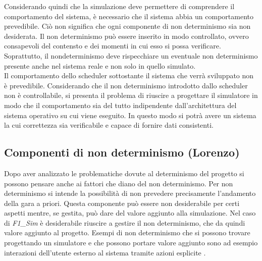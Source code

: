 Considerando quindi che la simulazione deve permettere di comprendere il comportamento del sistema, è necessario che il sistema abbia 
un comportamento prevedibile. Ciò non significa che ogni componente di non determinismo sia non desiderata. Il non determinismo
può essere inserito in modo controllato, ovvero consapevoli del contensto e dei momenti in cui esso si possa verificare. Soprattutto,
il nondeterminismo deve rispecchiare un eventuale non determinismo presente anche nel sistema reale e non solo in quello simulato.\\
Il comportamento dello scheduler sottostante il sistema che verrà sviluppato non è prevedibile. Considerando che il non determinismo
introdotto dallo scheduler non è controllabile, si presenta
il problema di riuscire a progettare il simulatore in modo
che il comportamento sia del tutto indipendente dall'architettura del sistema operativo su cui viene eseguito. In questo
modo si potrà avere un sistema la cui correttezza sia verificabile e capace di fornire dati consistenti.
\subsection{Componenti di non determinismo (Lorenzo)}
\label{non_determinismo}
Dopo aver analizzato le problematiche dovute al determinismo del progetto si possono pensare anche ai fattori che diano del non determinismo.
Per non determinismo si intende la possibilit\`{a} di non prevedere precisamente l'andamento della gara a priori. Questa componente pu\`{o} essere non desiderabile per certi aspetti mentre, se gestita, pu\`{o} dare del valore aggiunto alla simulazione. Nel caso di \emph{F1\_Sim} \`{e} desiderabile riuscire a gestire il non determinismo, che da quindi valore aggiunto al progetto.
Esempi di non determinismo che si possono trovare progettando un simulatore e che possono portare valore aggiunto sono ad esempio interazioni dell'utente esterno al sistema tramite azioni esplicite .
